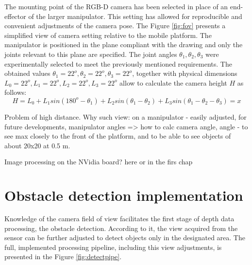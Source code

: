 The mounting point of the RGB-D camera has been selected in place of an end-effector of the larger manipulator. This setting has allowed for reproducible and convenient adjustments of the camera pose. The Figure \ref{fig:fov} presents a simplified view of camera setting relative to the mobile platform. The manipulator is positioned in the plane compliant with the drawing and only the joints relevant to this plane are specified. The joint angles $\theta_1, \theta_2, \theta_3$ were experimentally selected to meet the previously mentioned requirements. The obtained values $\theta_1 = 22^o, \theta_2 = 22^o , \theta_3 = 22^o$,
together with physical dimensions $L_0 = 22^o, L_1 = 22^o, L_2 = 22^o, L_3 = 22^o$
allow to calculate the camera height $H$ as follows:
$$ H = L_0 + L_1 sin(180^o-\theta_1)+L_2 sin(\theta_1 - \theta_2) + L_3 sin(\theta_1 - \theta_2 - \theta_3) = x $$




Problem of high distance. Why such view: on a manipulator - easily adjusted, for future developments, manipulator angles => how to calc camera angle, angle - to see max closely to the front of the platform, and to be able to see objects of about 20x20 at 0.5 m.

Image processing on the NVidia board? here or in the firs chap


\section{Obstacle detection implementation}
\label{sec:objavoid}

Knowledge of the camera field of view facilitates the first stage of depth data processing, the obstacle detection. According to it, the view acquired from the sensor can be further adjusted to detect objects only in the designated area. The full, implemented processing pipeline, including this view adjustments, is presented in the Figure \ref{fig:detectpipe}.

